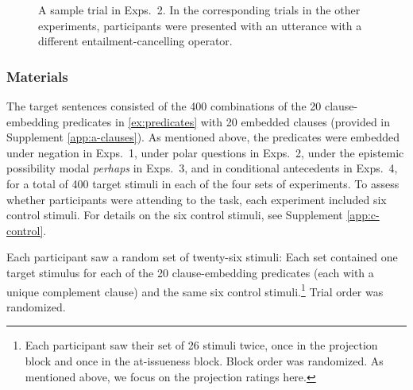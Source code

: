 \documentclass[a4paper,12pt,twoside]{article}
\begin{document}
            \begin{figure}[h!]
				\centering
				\caption{A sample trial in Exps.~2. In the corresponding trials in the other experiments, participants were presented with an utterance with a different entailment-cancelling operator.}
				\label{fig:trial}
			\end{figure}
   
		\subsubsection{Materials}

            The target sentences consisted of the 400 combinations of the 20 clause-embedding predicates in \ref{ex:predicates} with 20 embedded clauses (provided in Supplement \ref{app:a-clauses}). As mentioned above, the predicates were embedded under negation in Exps.~1, under polar questions in Exps.~2, under the epistemic possibility modal \emph{perhaps} in Exps.~3, and in conditional antecedents in Exps.~4, for a total of 400 target stimuli in each of the four sets of experiments. To assess whether participants were attending to the task, each experiment included six control stimuli. For details on the six control stimuli, see Supplement \ref{app:c-control}.

Each participant saw a random set of twenty-six stimuli: Each set contained one target stimulus for each of the 20 clause-embedding predicates (each with a unique complement clause) and the same six control stimuli.\footnote{Each participant saw their set of 26 stimuli twice, once in the projection block and once in the at-issueness block. Block order was randomized. As mentioned above, we focus on the projection ratings here.} Trial order was randomized.
  
  
\end{document}
